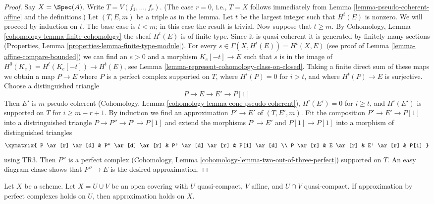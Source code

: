 \begin{proof}
Say $X = \Spec(A)$. Write $T = V(f_1, \ldots, f_r)$.
(The case $r = 0$, i.e., $T = X$ follows immediately from
Lemma \ref{lemma-pseudo-coherent-affine} and the definitions.)
Let $(T, E, m)$ be a triple as in the lemma.
Let $t$ be the largest integer such that $H^t(E)$ is nonzero.
We will proceed by induction on $t$. The base case is $t < m$; in
this case the result is trivial. Now suppose that $t \geq m$. By
Cohomology, Lemma \ref{cohomology-lemma-finite-cohomology}
the sheaf $H^t(E)$ is of finite type. Since it is quasi-coherent
it is generated by finitely many sections
(Properties, Lemma \ref{properties-lemma-finite-type-module}).
For every $s \in \Gamma(X, H^t(E)) = H^t(X, E)$
(see proof of Lemma \ref{lemma-affine-compare-bounded})
we can find an $e > 0$ and a morphism $K_e[-t] \to E$
such that $s$ is in the image of
$H^0(K_e) = H^t(K_e[-t]) \to H^t(E)$, see
Lemma \ref{lemma-represent-cohomology-class-on-closed}.
Taking a finite direct sum of these maps we obtain a map
$P \to E$ where $P$ is a perfect complex supported on $T$,
where $H^i(P) = 0$ for $i > t$, and where $H^t(P) \to E$ is
surjective. Choose a distinguished triangle
$$
P \to E \to E' \to P[1]
$$
Then $E'$ is $m$-pseudo-coherent
(Cohomology, Lemma \ref{cohomology-lemma-cone-pseudo-coherent}),
$H^i(E') = 0$ for $i \geq t$, and
$H^i(E')$ is supported on $T$ for $i \geq m - r + 1$.
By induction we find an approximation $P' \to E'$
of $(T, E', m)$. Fit the composition $P' \to E' \to P[1]$
into a distringuished triangle $P \to P'' \to P' \to P[1]$
and extend the morphisms $P' \to E'$ and $P[1] \to P[1]$ into
a morphism of distinguished triangles
$$
\xymatrix{
P \ar[r] \ar[d] & P'' \ar[d] \ar[r] & P' \ar[d] \ar[r] & P[1] \ar[d] \\
P \ar[r] &  E \ar[r] & E' \ar[r] & P[1]
}
$$
using TR3. Then $P''$ is a perfect complex
(Cohomology, Lemma \ref{cohomology-lemma-two-out-of-three-perfect})
supported on $T$.
An easy diagram chase shows that $P'' \to E$ is the desired
approximation.
\end{proof}

\begin{lemma}
\label{lemma-induction-step}
Let $X$ be a scheme. Let $X = U \cup V$ be an open covering
with $U$ quasi-compact, $V$ affine, and $U \cap V$ quasi-compact.
If approximation by perfect complexes holds on $U$,
then approximation holds on $X$.
\end{lemma}


